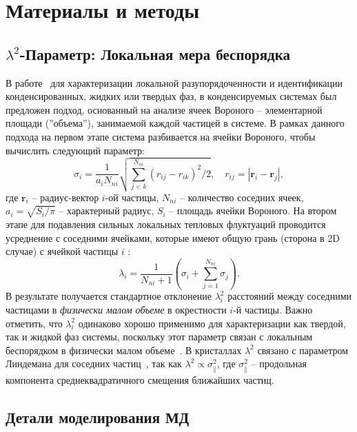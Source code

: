 \section{Материалы и методы}

\subsection{$\lambda^2$-Параметр: Локальная мера беспорядка}
\label{SSMF-AppA}

В работе~\cite{10.1021/acs.jpcc.7b09317} для характеризации локальной разупорядоченности и идентификации конденсированных, жидких или твердых фаз, в конденсируемых системах был предложен подход, основанный на анализе ячеек Вороного -- элементарной площади (''объема''), занимаемой каждой частицей в системе.
В рамках данного подхода на первом этапе система разбивается на ячейки Вороного, чтобы вычислить следующий параметр:
\begin{equation}
\label{SSMF-eq1}
\sigma_{i} =\frac{1}{a_i N_{ni}}\sqrt{\sum_{j<k}^{N_{ni}}{(r_{ij}-r_{ik})^2}/2}, \quad r_{ij}=|\mathbf{r}_i-\mathbf{r}_j|,
\end{equation}
где $\mathbf{r}_i$ -- радиус-вектор $i$-ой частицы, $N_{ni}$ -- количество соседних ячеек, $a_i = \sqrt{S_i/\pi}$ -- характерный радиус, $S_i$ -- площадь ячейки Вороного.
На втором этапе для подавления сильных локальных тепловых флуктуаций проводится усреднение с соседними ячейками, которые имеют общую грань (сторона в 2D случае) с ячейкой частицы $i$ \cite{10.1021/acs.jpcc.7b09317}:
\begin{equation}
\label{SSMF-eq2}
\lambda_{i} = \frac{1}{N_{ni}+1}\left(\sigma_{i}+\sum_{j=1}^{N_{ni}}{\sigma_{j}}\right).
\end{equation}
В результате получается стандартное отклонение $\lambda_i^2$ расстояний между соседними частицами в \emph{физически малом объеме} в окрестности $i$-й частицы.
Важно отметить, что $\lambda_i^2$ одинаково хорошо применимо для характеризации как твердой, так и жидкой фаз системы, поскольку этот параметр связан с локальным беспорядком в физически малом объеме~\cite{10.1021/acs.jpcc.7b09317}.
В кристаллах $\lambda^2$ связано с параметром Линдемана для соседних частиц~\cite{10.1016/0375-9601(85)90617-6}, так как $\lambda^2 \propto \sigma_\|^2$, где $\sigma_\|^2$ -- продольная компонента среднеквадратичного смещения ближайших частиц.


\subsection{Детали моделирования МД}
\label{SSMF-AppC}

